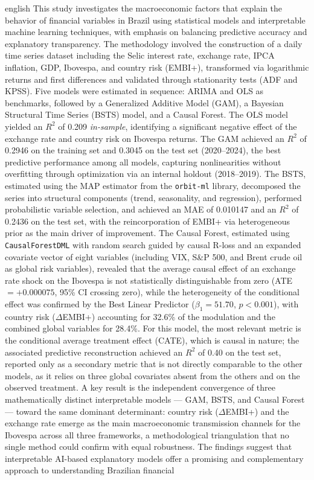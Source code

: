 \documentclass[	12pt, Times, openright, oneside, a4paper, english, brazil]{abntex2}
\begin{document}
\begin{resumo}[Abstract]
 \begin{otherlanguage*}{english}
   This study investigates the macroeconomic factors that explain the behavior of financial variables in Brazil using statistical models and interpretable machine learning techniques, with emphasis on balancing predictive accuracy and explanatory transparency. The methodology involved the construction of a daily time series dataset including the Selic interest rate, exchange rate, IPCA inflation, GDP, Ibovespa, and country risk (EMBI+), transformed via logarithmic returns and first differences and validated through stationarity tests (ADF and KPSS). Five models were estimated in sequence: ARIMA and OLS as benchmarks, followed by a Generalized Additive Model (GAM), a Bayesian Structural Time Series (BSTS) model, and a Causal Forest. The OLS model yielded an $R^2$ of 0.209 \textit{in-sample}, identifying a significant negative effect of the exchange rate and country risk on Ibovespa returns. The GAM achieved an $R^2$ of 0.2946 on the training set and 0.3045 on the test set (2020--2024), the best predictive performance among all models, capturing nonlinearities without overfitting through optimization via an internal holdout (2018--2019). The BSTS, estimated using the MAP estimator from the \texttt{orbit-ml} library, decomposed the series into structural components (trend, seasonality, and regression), performed probabilistic variable selection, and achieved an MAE of 0.010147 and an $R^2$ of 0.2436 on the test set, with the reincorporation of EMBI+ via heterogeneous prior as the main driver of improvement. The Causal Forest, estimated using \texttt{CausalForestDML} with random search guided by causal R-loss and an expanded covariate vector of eight variables (including VIX, S\&P 500, and Brent crude oil as global risk variables), revealed that the average causal effect of an exchange rate shock on the Ibovespa is not statistically distinguishable from zero (ATE $= +0.000075$, 95\% CI crossing zero), while the heterogeneity of the conditional effect was confirmed by the Best Linear Predictor ($\beta_1 = 51.70$, $p < 0.001$), with country risk ($\Delta$EMBI+) accounting for 32.6\% of the modulation and the combined global variables for 28.4\%. For this model, the most relevant metric is the conditional average treatment effect (CATE), which is causal in nature; the associated predictive reconstruction achieved an $R^2$ of 0.40 on the test set, reported only as a secondary metric that is not directly comparable to the other models, as it relies on three global covariates absent from the others and on the observed treatment. A key result is the independent convergence of three mathematically distinct interpretable models — GAM, BSTS, and Causal Forest — toward the same dominant determinant: country risk ($\Delta$EMBI+) and the exchange rate emerge as the main macroeconomic transmission channels for the Ibovespa across all three frameworks, a methodological triangulation that no single method could confirm with equal robustness. The findings suggest that interpretable AI-based explanatory models offer a promising and complementary approach to understanding Brazilian financial 
\end{otherlanguage*}
\end{resumo}
\end{document}
